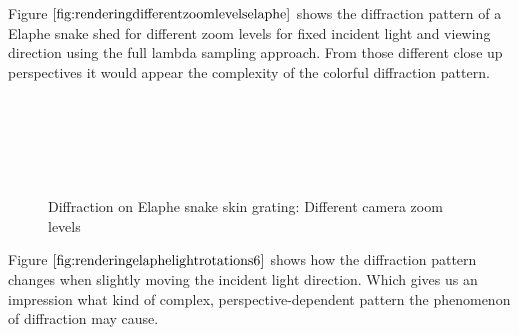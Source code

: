 Figure $\ref{fig:renderingdifferentzoomlevelselaphe}$ shows the diffraction pattern of a Elaphe snake shed for different zoom levels for fixed incident light and viewing direction using the full lambda sampling approach. From those different close up perspectives it would appear the complexity of the colorful diffraction pattern.

\begin{figure}[H]
  \centering
~
  
~
  
~
  
\caption{Diffraction on Elaphe snake skin grating: Different camera zoom levels}
\label{fig:renderingdifferentzoomlevelselaphe}
\end{figure}


Figure $\ref{fig:renderingelaphelightrotations6}$ shows how the diffraction pattern changes when slightly moving the incident light direction. Which gives us an impression what kind of complex, perspective-dependent pattern the phenomenon of diffraction may cause.

